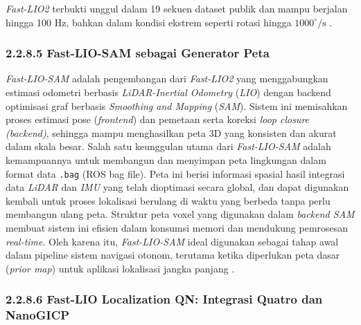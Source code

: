 \emph{Fast-LIO2} terbukti unggul dalam 19 sekuen dataset publik dan mampu berjalan hingga 100 Hz, bahkan dalam kondisi ekstrem seperti rotasi hingga $1000^\circ/\text{s}$ \cite{xu2022fastlio}.

\subsubsection{2.2.8.5 Fast-LIO-SAM sebagai Generator Peta}

\emph{Fast-LIO-SAM} adalah pengembangan dari \emph{Fast-LIO2} yang menggabungkan estimasi odometri berbasis \emph{LiDAR-Inertial Odometry} (\emph{LIO}) dengan backend optimisasi graf berbasis \emph{Smoothing and Mapping} (\emph{SAM}). Sistem ini memisahkan proses estimasi pose (\emph{frontend}) dan pemetaan serta koreksi \emph{loop closure (backend)}, sehingga mampu menghasilkan peta 3D yang konsisten dan akurat dalam skala besar. Salah satu keunggulan utama dari \emph{Fast-LIO-SAM} adalah kemampuannya untuk membangun dan menyimpan peta lingkungan dalam format data \texttt{.bag} (ROS bag file). Peta ini berisi informasi spasial hasil integrasi data \emph{LiDAR} dan \emph{IMU} yang telah dioptimasi secara global, dan dapat digunakan kembali untuk proses lokalisasi berulang di waktu yang berbeda tanpa perlu membangun ulang peta. Struktur peta voxel yang digunakan dalam \emph{backend SAM} membuat sistem ini efisien dalam konsumsi memori dan mendukung pemrosesan \emph{real-time}. Oleh karena itu, \emph{Fast-LIO-SAM} ideal digunakan sebagai tahap awal dalam pipeline sistem navigasi otonom, terutama ketika diperlukan peta dasar (\emph{prior map}) untuk aplikasi lokalisasi jangka panjang \cite{xu2022fastlio}.

\subsubsection{2.2.8.6 Fast-LIO Localization QN: Integrasi Quatro dan NanoGICP}

